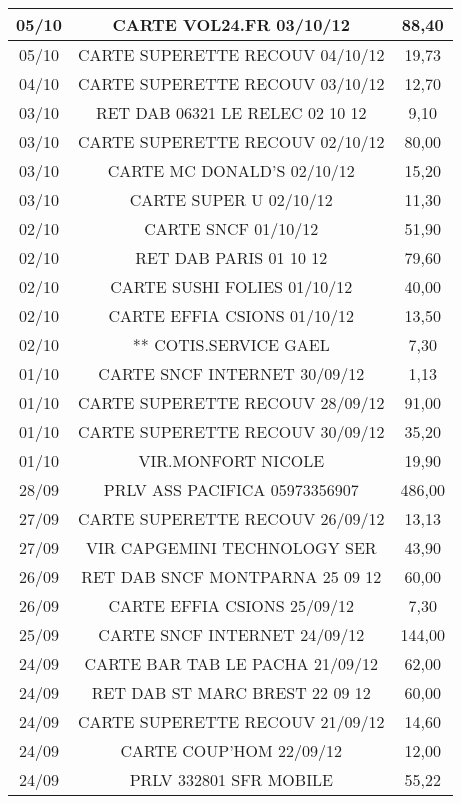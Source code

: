 \begin{tabular}{|c|c|c|}
\hline
05/10 & CARTE VOL24.FR         03/10/12 & 88,40 \\
\hline
05/10 & CARTE SUPERETTE RECOUV 04/10/12 & 19,73 \\
\hline
04/10 & CARTE SUPERETTE RECOUV 03/10/12 & 12,70 \\
\hline
03/10 & RET DAB 06321 LE RELEC 02 10 12 & 9,10 \\
\hline
03/10 & CARTE SUPERETTE RECOUV 02/10/12 & 80,00 \\
\hline
03/10 & CARTE MC DONALD'S      02/10/12 & 15,20 \\
\hline
03/10 & CARTE SUPER U          02/10/12 & 11,30 \\
\hline
02/10 & CARTE SNCF             01/10/12 & 51,90 \\
\hline
02/10 & RET DAB PARIS          01 10 12 & 79,60 \\
\hline
02/10 & CARTE SUSHI FOLIES     01/10/12 & 40,00 \\
\hline
02/10 & CARTE EFFIA CSIONS     01/10/12 & 13,50 \\
\hline
02/10 & ** COTIS.SERVICE GAEL & 7,30 \\
\hline
01/10 & CARTE SNCF INTERNET    30/09/12 & 1,13 \\
\hline
01/10 & CARTE SUPERETTE RECOUV 28/09/12 & 91,00 \\
\hline
01/10 & CARTE SUPERETTE RECOUV 30/09/12 & 35,20 \\
\hline
01/10 & VIR.MONFORT NICOLE & 19,90 \\
\hline
28/09 & PRLV   ASS PACIFICA  05973356907 & 486,00 \\
\hline
27/09 & CARTE SUPERETTE RECOUV 26/09/12 & 13,13 \\
\hline
27/09 & VIR    CAPGEMINI TECHNOLOGY SER & 43,90 \\
\hline
26/09 & RET DAB SNCF MONTPARNA 25 09 12 & 60,00 \\
\hline
26/09 & CARTE EFFIA CSIONS     25/09/12 & 7,30 \\
\hline
25/09 & CARTE SNCF INTERNET    24/09/12 & 144,00 \\
\hline
24/09 & CARTE BAR TAB LE PACHA 21/09/12 & 62,00 \\
\hline
24/09 & RET DAB ST MARC BREST  22 09 12 & 60,00 \\
\hline
24/09 & CARTE SUPERETTE RECOUV 21/09/12 & 14,60 \\
\hline
24/09 & CARTE COUP'HOM         22/09/12 & 12,00 \\
\hline
24/09 & PRLV 332801   SFR MOBILE & 55,22 \\

\end{tabular}
